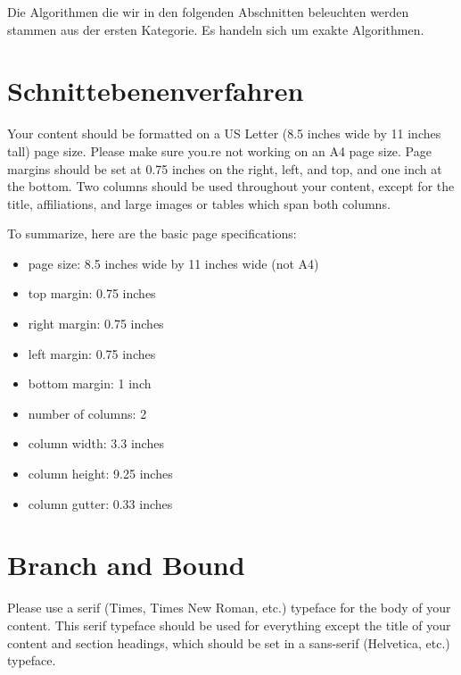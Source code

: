 \documentclass[tog]{acmsiggraph}
\begin{document}
Die Algorithmen die wir in den folgenden Abschnitten beleuchten werden stammen aus der ersten Kategorie. Es handeln sich um exakte Algorithmen. 

\section{Schnittebenenverfahren}

Your content should be formatted on a US Letter (8.5 inches wide by 11
inches tall) page size. Please make sure you.re not working on an A4
page size. Page margins should be set at 0.75 inches on the right,
left, and top, and one inch at the bottom. Two columns should be used
throughout your content, except for the title, affiliations, and large
images or tables which span both columns.

To summarize, here are the basic page specifications: 
\begin{itemize}
\item page size: 8.5 inches wide by 11 inches wide (not A4)
\item top margin: 0.75 inches
\item right margin: 0.75 inches
\item left margin: 0.75 inches
\item bottom margin: 1 inch
\item number of columns: 2
\item column width: 3.3 inches
\item column height: 9.25 inches
\item column gutter: 0.33 inches
\end{itemize}

\section{Branch and Bound}


Please use a serif (Times, Times New Roman, etc.) typeface for the
body of your content. This serif typeface should be used for
everything except the title of your content and section headings,
which should be set in a sans-serif (Helvetica, etc.) typeface.
\end{document}
